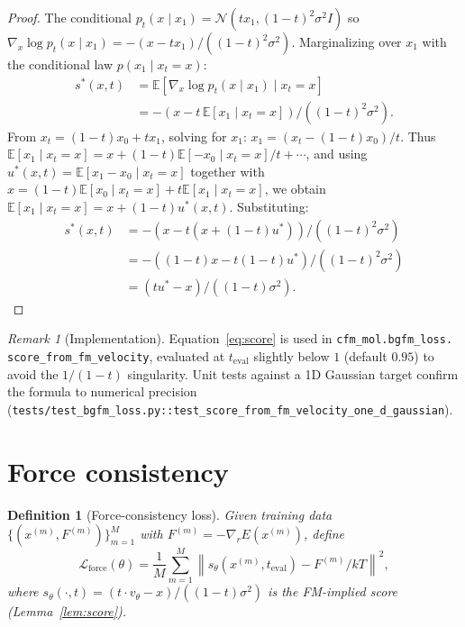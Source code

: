 \documentclass[11pt]{article}
\newtheorem{definition}[theorem]{Definition}
\theoremstyle{remark}
\newtheorem{remark}[theorem]{Remark}
\theoremstyle{plain}
\newcommand{\E}{\mathbb{E}}
\newcommand{\force}{\mathrm{force}}
\newcommand{\norm}[1]{\left\|#1\right\|}
\begin{document}
\begin{proof}
The conditional $p_t(x \mid x_1) = \mathcal{N}(t x_1, (1-t)^2 \sigma^2 I)$
so $\nabla_x \log p_t(x \mid x_1) = -(x - t x_1) / ((1-t)^2 \sigma^2)$.
Marginalizing over $x_1$ with the conditional law $p(x_1 \mid x_t = x)$:
\begin{align*}
s^*(x, t)
  &= \E[\nabla_x \log p_t(x \mid x_1) \mid x_t = x] \\
  &= -(x - t\, \E[x_1 \mid x_t = x]) / ((1-t)^2 \sigma^2).
\end{align*}
From $x_t = (1 - t) x_0 + t x_1$, solving for $x_1$:
$x_1 = (x_t - (1-t) x_0)/t$. Thus
$\E[x_1 \mid x_t = x] = x + (1-t) \E[-x_0 \mid x_t = x] / t + \cdots$,
and using $u^*(x, t) = \E[x_1 - x_0 \mid x_t = x]$ together with
$x = (1-t) \E[x_0 \mid x_t = x] + t \E[x_1 \mid x_t = x]$, we obtain
$\E[x_1 \mid x_t = x] = x + (1-t) u^*(x, t)$. Substituting:
\begin{align*}
s^*(x, t) &= -(x - t(x + (1-t) u^*)) / ((1-t)^2 \sigma^2) \\
          &= -((1-t) x - t (1-t) u^*) / ((1-t)^2 \sigma^2) \\
          &= (t u^* - x) / ((1-t) \sigma^2).
\end{align*}
\end{proof}

\begin{remark}[Implementation]
Equation~\eqref{eq:score} is used in \texttt{cfm\_mol.bgfm\_loss.
score\_from\_fm\_velocity}, evaluated at $t_\text{eval}$ slightly below
$1$ (default $0.95$) to avoid the $1/(1-t)$ singularity. Unit tests
against a 1D Gaussian target confirm the formula to numerical precision
(\texttt{tests/test\_bgfm\_loss.py::test\_score\_from\_fm\_velocity\_one\_d\_gaussian}).
\end{remark}

\section{Force consistency}

\begin{definition}[Force-consistency loss]
Given training data $\{(x^{(m)}, F^{(m)})\}_{m=1}^M$ with $F^{(m)}
= -\nabla_r E(x^{(m)})$, define
\begin{equation}\label{eq:lforce}
\mathcal{L}_\force(\theta)
  = \frac{1}{M} \sum_{m=1}^M
       \norm{s_\theta(x^{(m)}, t_\mathrm{eval}) - F^{(m)} / kT}^2,
\end{equation}
where $s_\theta(\cdot, t) = (t \cdot v_\theta - x)/((1-t)\sigma^2)$ is
the FM-implied score (Lemma~\ref{lem:score}).
\end{definition}
\end{document}
